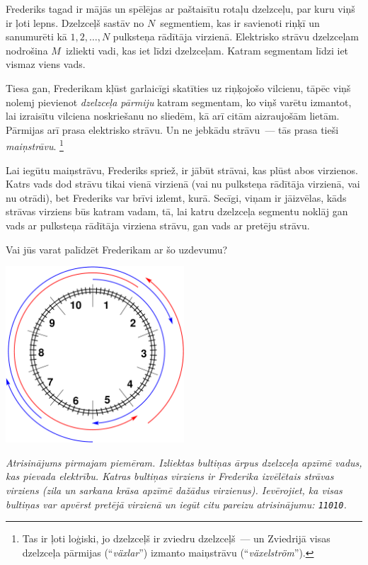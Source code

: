 \ifx\boi\undefined\fi
\def\version{jury-1}
Frederiks tagad ir mājās un spēlējas ar paštaisītu rotaļu dzelzceļu, par kuru viņš ir ļoti lepns.
Dzelzceļš sastāv no $N$~segmentiem, kas ir savienoti riņķī un sanumurēti kā $1, 2, \dots, N$ pulksteņa rādītāja virzienā.
Elektrisko strāvu dzelzceļam nodrošina $M$~izliekti vadi, kas iet līdzi dzelzceļam.
Katram segmentam līdzi iet vismaz viens vads.

Tiesa gan, Frederikam kļūst garlaicīgi skatīties uz riņķojošo vilcienu, tāpēc viņš nolemj pievienot \emph{dzelzceļa pārmiju}
katram segmentam, ko viņš varētu izmantot, lai izraisītu vilciena noskriešanu no sliedēm, kā arī citām aizraujošām lietām.
Pārmijas arī prasa elektrisko strāvu. Un ne jebkādu strāvu~--- tās prasa tieši \emph{maiņstrāvu}.%
\footnote{Tas ir ļoti loģiski, jo dzelzceļš ir zviedru dzelzceļš~--- un Zviedrijā visas dzelzceļa pārmijas
(``\emph{växlar}'') izmanto maiņstrāvu (``\emph{växelström}'').}

Lai iegūtu maiņstrāvu, Frederiks spriež, ir jābūt strāvai, kas plūst abos
virzienos. Katrs vads dod strāvu tikai vienā virzienā (vai nu pulksteņa rādītāja virzienā,
vai nu otrādi), bet Frederiks var brīvi izlemt, kurā. Secīgi, viņam ir jāizvēlas,
kāds strāvas virziens būs katram vadam, tā, lai katru dzelzceļa segmentu noklāj gan vads ar pulksteņa
rādītāja virziena strāvu, gan vads ar pretēju strāvu.

Vai jūs varat palīdzēt Frederikam ar šo uzdevumu?

\vspace{2mm}
\begin{center}
\includegraphics[width=0.5\textwidth]{alternatingfig.pdf}
\end{center}
\vspace{1mm}
{\em Atrisinājums pirmajam piemēram. Izliektas bultiņas ārpus dzelzceļa apzīmē vadus, kas pievada elektrību. Katras bultiņas virziens ir Frederika izvēlētais strāvas virziens (zila un sarkana krāsa apzīmē dažādus virzienus). Ievērojiet, ka visas bultiņas var apvērst pretējā virzienā un iegūt citu pareizu atrisinājumu: \texttt{11010}.}

